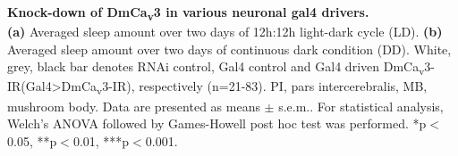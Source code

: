 \label{fig:S4}
\textbf{Knock-down of DmCa\textsubscript{v}3 in various neuronal gal4 drivers.}
\\
\textbf {(a)} Averaged sleep amount over two days of 12h:12h light-dark cycle (LD).
\textbf {(b)} Averaged sleep amount over two days of continuous dark condition (DD).
White, grey, black bar denotes RNAi control, Gal4 control and Gal4 driven DmCa\textsubscript{v}3-IR(Gal4\textgreater{}DmCa\textsubscript{v}3-IR), respectively (n=21-83).
PI, pars intercerebralis, MB, mushroom body. 
Data are presented as means $\pm$ s.e.m..
For statistical analysis, Welch's ANOVA followed by Games-Howell post hoc test was performed.
*p$<$0.05, **p$<$0.01, ***p$<$0.001.
  
  
  
  
  